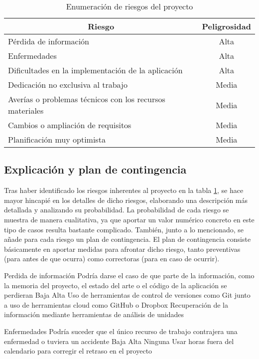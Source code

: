 \begin{table}[H]
	\centering
	\begin{tabular}{ |l|c| } 
		\hline
		\multicolumn{1}{|c|}{Riesgo} & 
		\multicolumn{1}{|c|}{Peligrosidad} \\
		\hline
			Pérdida de información										& Alta	\\
			Enfermedades												& Alta	\\
			Dificultades en la implementación de la aplicación			& Alta	\\
			Dedicación no exclusiva al trabajo							& Media	\\
			Averías o problemas técnicos con los recursos materiales	& Media	\\
			Cambios o ampliación de requisitos							& Media	\\
			Planificación muy optimista									& Media	\\
		\hline
	\end{tabular}
	\caption{Enumeración de riesgos del proyecto}
	\label{table:riesgos}
\end{table}


\subsection{Explicación y plan de contingencia}
Tras haber identificado los riesgos inherentes al proyecto en la tabla \ref{table:riesgos}, se hace mayor hincapié en los detalles de dicho riesgos, elaborando una descripción más detallada y analizando su probabilidad. La probabilidad de cada riesgo se muestra de manera cualitativa, ya que aportar un valor numérico concreto en este tipo de casos resulta bastante complicado. También, junto a lo mencionado, se añade para cada riesgo un plan de contingencia. El plan de contingencia consiste básicamente en aportar medidas para afrontar dicho riesgo, tanto preventivas (para antes de que ocurra) como correctoras (para en caso de ocurrir).

\riskframe
	{Perdida de información}
	{Podría darse el caso de que parte de la información, como la memoria del proyecto, el estado del arte o el código de la aplicación se perdieran}
	{Baja}
	{Alta}
	{Uso de herramientas de control de versiones como Git junto a uso de herramientas cloud como GitHub o Dropbox}
	{Recuperación de la información mediante herramientas de análisis de unidades}

\riskframe
	{Enfermedades}
	{Podría suceder que el único recurso de trabajo contrajera una enfermedad o tuviera un accidente}
	{Baja}
	{Alta}
	{Ninguna}
	{Usar horas fuera del calendario para corregir el retraso en el proyecto}


